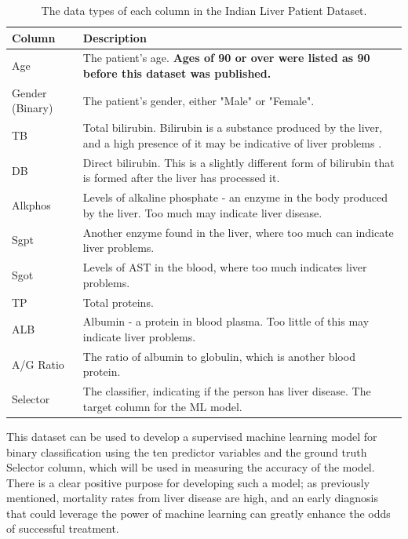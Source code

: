 \documentclass[12pt]{report}
\begin{document}
\begin{table}[H]
    \centering
        \begin{tabular}{ |p{}| p{}|}
            \hline
            \cellcolor{blue!25}Column & \cellcolor{blue!25}Description\\
            \hline
            Age & The patient's age. \textbf{Ages of 90 or over were listed as 90 before this dataset was published.} \\
            \hline
            Gender (Binary) & The patient's gender, either "Male" or "Female".\\
            \hline
            TB & Total bilirubin. Bilirubin is a substance produced by the liver, and a high presence of it may be indicative of
            liver problems \autocite{mayo_clinic_bilirubin_nodate}.\\
            \hline
            DB & Direct bilirubin. This is a slightly different form of bilirubin that is formed after the liver has processed it.\\
            \hline
            Alkphos & Levels of alkaline phosphate - an enzyme in the body produced by the liver. Too much may indicate liver disease. \autocite{clevelandclinic_alkaline_nodate}\\
            \hline
            Sgpt & Another enzyme found in the liver, where too much can indicate liver problems.\\
            \hline
            Sgot & Levels of AST in the blood, where too much indicates liver problems.\\
            \hline
            TP & Total proteins.\\
            \hline
            ALB & Albumin - a protein in blood plasma. Too little of this may indicate liver problems.\\
            \hline
            A/G Ratio & The ratio of albumin to globulin, which is another blood protein.\\
            \hline
            Selector & The classifier, indicating if the person has liver disease. The target column for the ML model.\\
            \hline
    \end{tabular}
    \caption{The data types of each column in the Indian Liver Patient Dataset.}\label{tab:ILPD-Types}
\end{table}

This dataset can be used to develop a supervised machine learning model for binary classification using the ten predictor 
variables and the ground truth Selector column, which will be used in measuring the accuracy of the model. There is a clear 
positive purpose for developing such a model; as previously mentioned, mortality rates from liver disease are high, and an early
diagnosis that could leverage the power of machine learning can greatly enhance the odds of successful treatment.
\end{document}
